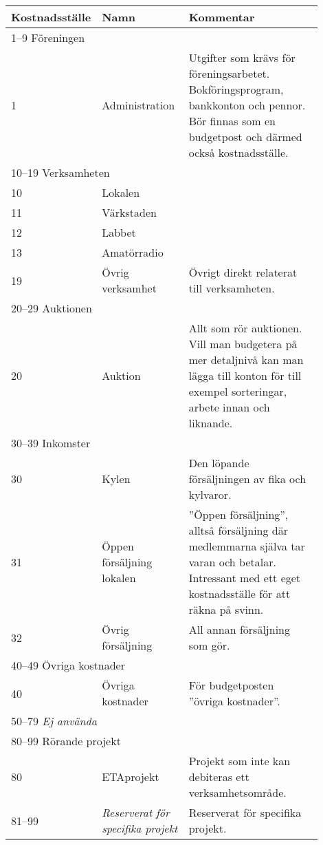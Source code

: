 \begin{longtable}[l]{l p{0.3\linewidth} p{0.6\linewidth}}
	Kostnadsställe	&	Namn								& Kommentar \\ \toprule \endhead
	\multicolumn{3}{l}{1--9 Föreningen}\\
	1				&	Administration						& Utgifter som krävs för föreningsarbetet. Bokföringsprogram, bankkonton och pennor. Bör finnas som en budgetpost och därmed också kostnadsställe.\\
	\multicolumn{3}{l}{10--19 Verksamheten}\\
	10				&	Lokalen\\
	11				&	Värkstaden\\
	12				&	Labbet\\
	13				&	Amatörradio\\
	19				&	Övrig verksamhet					& Övrigt direkt relaterat till verksamheten.\\
	\multicolumn{3}{l}{20--29 Auktionen}\\
	20				&	Auktion								& Allt som rör auktionen. Vill man budgetera på mer detaljnivå kan man lägga till konton för till exempel sorteringar, arbete innan och liknande.\\
	\multicolumn{3}{l}{30--39 Inkomster}\\
	30				&	Kylen								& Den löpande försäljningen av fika och kylvaror.\\
	31				&	Öppen försäljning lokalen			& ”Öppen försäljning”, alltså försäljning där medlemmarna själva tar varan och betalar. Intressant med ett eget kostnadsställe för att räkna på svinn.\\
	32				&	Övrig försäljning					& All annan försäljning som \acr{eta} gör.\\
	\multicolumn{3}{l}{40--49 Övriga kostnader}\\
	40				&	Övriga kostnader					& För budgetposten ”övriga kostnader”.\\
	\multicolumn{3}{l}{50--79 \emph{Ej använda}}\\
	\multicolumn{3}{l}{80--99 Rörande projekt}\\
	80				&	ETAprojekt							& Projekt som inte kan debiteras ett verksamhetsområde.\\
	81--99			&	\emph{Reserverat för specifika projekt} & Reserverat för specifika projekt.\\
\end{longtable}